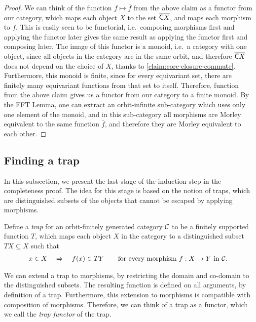 \begin{proof}
    We can think of the function $f \mapsto \bar f$ from the above claim as a functor from our category, which maps each object $X$ to the set $\overline{ \mathsf C X}$, and maps each morphism to $\bar f$. This is easily seen to be functorial, i.e.~composing morphisms first and applying the functor later gives the same result as applying the functor first and composing later. The image of this functor is a monoid, i.e.~a category with one object, since all objects in the category are in the same orbit, and therefore $\overline {\mathsf C X}$ does not depend on the choice of $X$, thanks to \cref{claim:core-closure-commute}. Furthermore, this monoid is finite, since for every equivariant set, there are finitely many equivariant functions from that set to itself. Therefore, function from the above claim gives us a functor from our category to a finite monoid. By the FFT Lemma, one can extract an orbit-infinite sub-category which uses only one element of the monoid, and in this sub-category all morphisms are Morley equivalent to the same function $\bar f$, and therefore they are Morley equivalent to each other.
\end{proof}




\subsection{Finding a trap}
\label{sec:trap-set}
In this subsection, we present the last stage of the induction step in the completeness proof. The idea for this stage is based on the notion of traps, which are distinguished subsets of the objects that cannot be escaped by applying morphisms.

\begin{definition}[Trap]
    Define a \emph{trap} for an orbit-finitely generated category ${\mathcal C}$ to be  a finitely  supported function $T$, which maps each object $X$ in the category to a distinguished subset $TX \subseteq X$ such that
    \begin{align*}
    x \in X \quad \Rightarrow \quad f(x) \in TY \qquad \text{for every morphism $f : X \to Y$ in ${\mathcal C}$.}
    \end{align*}
\end{definition}

We can extend a trap to morphisms, by restricting the domain and co-domain to the distinguished subsets. The resulting function is defined on all arguments, by definition of a trap. Furthermore, this extension to morphisms is compatible with composition of morphisms. Therefore, we can think of a trap as a functor, which we call the \emph{trap functor} of the trap.

